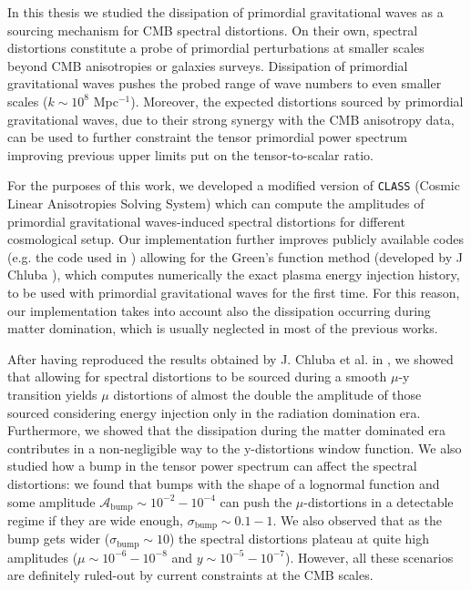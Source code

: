 In this thesis we studied the dissipation of primordial gravitational waves as a sourcing mechanism for CMB spectral distortions. On their own, spectral distortions constitute a probe of primordial perturbations at smaller scales beyond CMB anisotropies or galaxies surveys. Dissipation of primordial gravitational waves pushes the probed range of wave numbers to even smaller scales ($k\sim10^{8}$ Mpc$^{-1}$). Moreover, the expected distortions sourced by primordial gravitational waves, due to their strong synergy with the CMB anisotropy data, can be used to further constraint the tensor primordial power spectrum improving previous upper limits put on the tensor-to-scalar ratio.

For the purposes of this work, we developed a modified version of \texttt{CLASS} (Cosmic Linear Anisotropies Solving System) which can compute the amplitudes of primordial gravitational waves-induced spectral distortions for different cosmological setup. Our implementation further improves publicly available codes (e.g. the code used in \cite{Kite_2021}) allowing for the Green's function method (developed by J Chluba \cite{Chluba_Green}), which computes numerically the exact plasma energy injection history, to be used with primordial gravitational waves for the first time. For this reason, our implementation takes into account also the dissipation occurring during matter domination, which is usually neglected in most of the previous works.

After having reproduced the results obtained by J. Chluba et al. in \cite{Chluba_tens_diss}, we showed that allowing for spectral distortions to be sourced during a smooth $\mu$-y transition yields $\mu$ distortions of almost the double the amplitude of those sourced considering energy injection only in the radiation domination era. Furthermore, we showed that the dissipation during the matter dominated era contributes in a non-negligible way to the y-distortions window function. We also studied how a bump in the tensor power spectrum can affect the spectral distortions: we found that bumps with the shape of a lognormal function and some amplitude $\mathcal A_\text{bump}\sim10^{-2}-10^{-4}$ can push the $\mu$-distortions in a detectable regime if they are wide enough, $\sigma_\text{bump}\sim 0.1-1$. We also observed that as the bump gets wider ($\sigma_\text{bump}\sim10$) the spectral distortions plateau at quite high amplitudes ($\mu\sim10^{-6}-10^{-8}$ and $y\sim10^{-5}-10^{-7}$). However, all these scenarios are definitely ruled-out by current constraints at the CMB scales.

